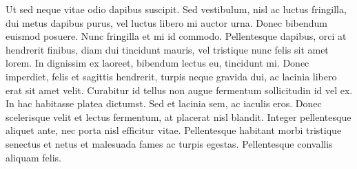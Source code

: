 Ut sed neque vitae odio dapibus suscipit. Sed vestibulum, nisl ac luctus fringilla, dui metus dapibus purus, vel luctus libero mi auctor urna. Donec bibendum euismod posuere. Nunc fringilla et mi id commodo. Pellentesque dapibus, orci at hendrerit finibus, diam dui tincidunt mauris, vel tristique nunc felis sit amet lorem. In dignissim ex laoreet, bibendum lectus eu, tincidunt mi. Donec imperdiet, felis et sagittis hendrerit, turpis neque gravida dui, ac lacinia libero erat sit amet velit. Curabitur id tellus non augue fermentum sollicitudin id vel ex. In hac habitasse platea dictumst. Sed et lacinia sem, ac iaculis eros. Donec scelerisque velit et lectus fermentum, at placerat nisl blandit. Integer pellentesque aliquet ante, nec porta nisl efficitur vitae. Pellentesque habitant morbi tristique senectus et netus et malesuada fames ac turpis egestas. Pellentesque convallis aliquam felis.